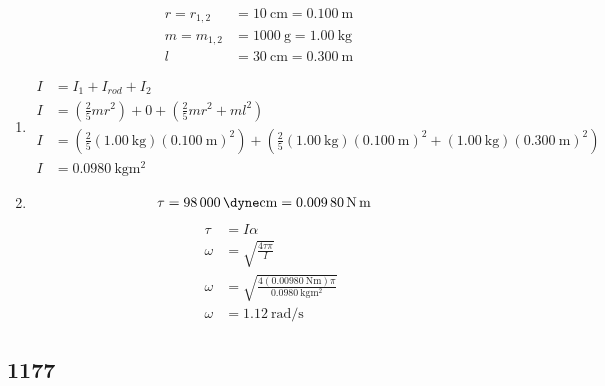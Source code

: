 \documentclass{article}
\begin{document}
\begin{align*}
	r = r_{1,2} & = \SI{10}{\centi \meter} = \SI{0.100}{\meter} \\
	m = m_{1,2} & = \SI{1000}{\gram} = \SI{1.00}{\kilogram} \\
	l & = \SI{30}{\centi \meter} = \SI{0.300}{\meter}
\end{align*}
\begin{enumerate}[label = \boldalpha]
	\item
		\begin{align*}
			I & = I_1 + I_{rod} + I_2 \\
			I & = \left( \frac{2}{5}mr^2 \right) + 0 + \left( \frac{2}{5}mr^2 + ml^2 \right) \\
			I & = \left( \frac{2}{5}(\SI{1.00}{\kilogram})(\SI{0.100}{\meter})^2 \right) + \left( \frac{2}{5}(\SI{1.00}{\kilogram})(\SI{0.100}{\meter})^2 + (\SI{1.00}{\kilogram})(\SI{0.300}{\meter})^2 \right) \\
			I & = \SI{0.0980}{\kilogram \meter \squared}
		\end{align*}
	\item
		\begin{align*}
			\tau & = \SI{98000}{\dyne \centi \meter} = \SI{0.00980}{\newton \meter}
		\end{align*}
		\begin{align*}
			\tau & = I\alpha \\
			\omega & = \sqrt{ \frac{ 4\tau \pi }{ I } } \\
			\omega & = \sqrt{ \frac{ 4(\SI{0.00980}{\newton \meter})\pi }{ \SI{0.0980}{\kilogram \meter \squared} } } \\
			\omega & = \SI{1.12}{\radian \per \second}
		\end{align*}
\end{enumerate}

\subsection{1177}
\end{document}
